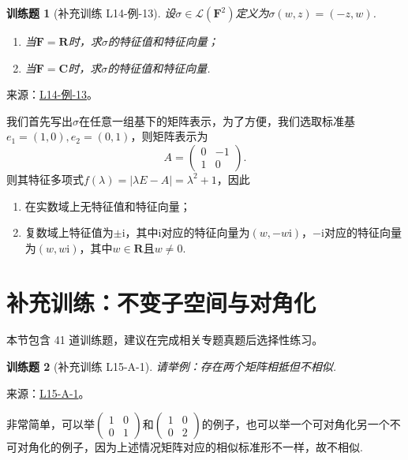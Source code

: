 \documentclass[UTF8,12pt,a4paper,fontset=fandol]{ctexart}
\newtheorem{exercise}{训练题}[section]
\begin{document}
\begin{exercise}[补充训练 L14-例-13]\label{prob:L14-例-13}
设$\sigma\in\mathcal{L}(\mathbf{F}^2)$定义为$\sigma(w,z)=(-z,w)$.
    \begin{enumerate}
        \item 当$\mathbf{F}=\mathbf{R}$时，求$\sigma$的特征值和特征向量；

        \item 当$\mathbf{F}=\mathbf{C}$时，求$\sigma$的特征值和特征向量.
    \end{enumerate}
\end{exercise}
\noindent 来源：\href{https://github.com/yhwu-is/Linear-Algebra-Left-Undone/blob/new/%E8%AE%B2%E4%B9%89/%E4%B8%93%E9%A2%98/14%20%E7%9B%B8%E4%BC%BC%E6%A0%87%E5%87%86%E5%BD%A2%EF%BC%9A%E5%8A%A8%E6%9C%BA%E4%B8%8E%E5%9F%BA%E7%A1%80.tex}{L14-例-13}。
\begin{solve}
我们首先写出$\sigma$在任意一组基下的矩阵表示，为了方便，我们选取标准基$e_1=(1,0),e_2=(0,1)$，则矩阵表示为
    \[ A=\begin{pmatrix}
            0 & -1 \\ 1 & 0
        \end{pmatrix}. \]
    则其特征多项式$f(\lambda)=|\lambda E-A|=\lambda^2+1$，因此
    \begin{enumerate}
        \item 在实数域上无特征值和特征向量；

        \item 复数域上特征值为$\pm\mathrm{i}$，其中$\mathrm{i}$对应的特征向量为$(w,-w\mathrm{i})$，$-\mathrm{i}$对应的特征向量为$(w,w\mathrm{i})$，其中$w\in\mathbf{R}$且$w\neq 0$.
    \end{enumerate}
\end{solve}

\section{补充训练：不变子空间与对角化}

本节包含 41 道训练题，建议在完成相关专题真题后选择性练习。

\begin{exercise}[补充训练 L15-A-1]\label{prob:L15-A-1}
请举例：存在两个矩阵相抵但不相似.
\end{exercise}
\noindent 来源：\href{https://github.com/yhwu-is/Linear-Algebra-Left-Undone/blob/new/%E8%AE%B2%E4%B9%89/%E4%B8%93%E9%A2%98/15%20%E7%9B%B8%E4%BC%BC%E6%A0%87%E5%87%86%E5%BD%A2%EF%BC%9A%E5%A4%8D%E6%95%B0%E5%9F%9F%E4%B8%8A%E7%9A%84%E5%B0%9D%E8%AF%95%E4%B8%8E%E7%90%86%E8%AE%BA.tex}{L15-A-1}。
\begin{solve}
非常简单，可以举$\begin{pmatrix}
                1 & 0 \\ 0 & 1
            \end{pmatrix}$和$\begin{pmatrix}
                1 & 0 \\ 0 & 2
            \end{pmatrix}$的例子，也可以举一个可对角化另一个不可对角化的例子，因为上述情况矩阵对应的相似标准形不一样，故不相似.
\end{solve}
\end{document}
